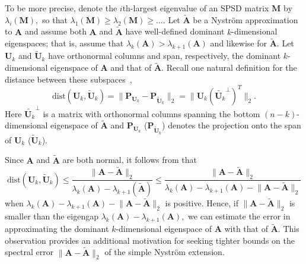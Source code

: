 \documentclass[11pt,letterpaper,twoside,reqno,nosumlimits]{amsart}
\def\transp{T}
\newcommand{\mat}[1]{\ensuremath{\mathbf{#1}}}
\newcommand{\snorm}[1]{\ensuremath{\big\|#1\big\|_2}}
\theoremstyle{remark}
\begin{document}
To be more precise, denote the $i$th-largest eigenvalue of an SPSD matrix $\mat{M}$ by $\lambda_i(\mat{M}),$ so that $\lambda_1(\mat{M}) \geq \lambda_2(\mat{M}) \geq \ldots.$ Let $\tilde{\mat{A}}$ be a Nystr\"om approximation to $\mat{A}$ and assume both $\mat{A}$ and $\tilde{\mat{A}}$ have well-defined dominant $k$-dimensional eigenspaces; that is, assume that $\lambda_{k}(\mat{A}) > \lambda_{k+1}(\mat{A})$ and likewise for $\tilde{\mat{A}}$. Let $\mat{U}_k$ and $\tilde{\mat{U}}_k$ have orthonormal columns and span, respectively, the dominant $k$-dimensional eigenspace of $\mat{A}$ and that of $\tilde{\mat{A}}.$ Recall one natural definition for the distance between these subspaces~\cite[Section 2.6.3]{GL96},  
\[
 \text{dist}(\mat{U}_k, \tilde{\mat{U}}_k) = \snorm{\mat{P}_{\mat{U}_k} - \mat{P}_{\tilde{\mat{U}}_k}} = \snorm{\mat{U}_k (\tilde{\mat{U}_k}^\perp)^\transp}.
\]
Here $\tilde{\mat{U}_k}^\perp$ is a matrix with orthonormal columns spanning the bottom $(n-k)$-dimensional eigenspace of $\tilde{\mat{A}}$ and $\mat{P}_{\mat{U}_k}$ ($\mat{P}_{\tilde{\mat{U}}_k}$) denotes the projection onto the span of $\mat{U}_k$ ($\tilde{\mat{U}}_k$).

Since $\mat{A}$ and $\tilde{\mat{A}}$ are both normal, it follows from \cite[Theorem VII.3.1]{Bhatia97} that 
\begin{equation}
 \text{dist}(\mat{U}_k, \tilde{\mat{U}}_k) \leq \frac{\snorm{\mat{A} - \tilde{\mat{A}}}}{\lambda_k(\mat{A}) - \lambda_{k+1}(\tilde{\mat{A}})} \leq \frac{\snorm{\mat{A} - \tilde{\mat{A}}}}{\lambda_k(\mat{A}) - \lambda_{k+1}(\mat{A}) - \snorm{\mat{A} - \tilde{\mat{A}}}}
\label{eqn:rawdksintheta}
\end{equation}
when $\lambda_k(\mat{A}) - \lambda_{k+1}(\mat{A}) - \snorm{\mat{A} - \tilde{\mat{A}}}$ is positive. Hence, if $\snorm{\mat{A} - \tilde{\mat{A}}}$ is smaller than the eigengap $\lambda_k(\mat{A}) - \lambda_{k+1}(\mat{A}),$ we can estimate the error in approximating the dominant $k$-dimensional eigenspace of $\mat{A}$ with that of $\tilde{\mat{A}}.$ This observation provides an additional motivation for seeking tighter bounds on the spectral error $\snorm{\mat{A} - \tilde{\mat{A}}}$ of the simple Nystr\"om extension.
\end{document}
